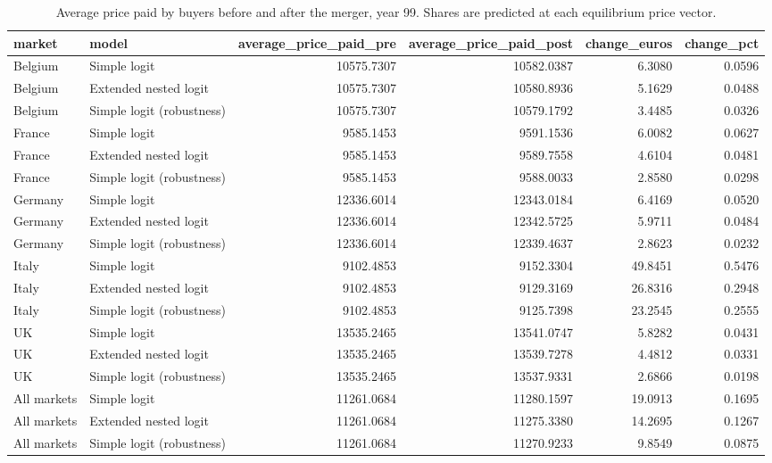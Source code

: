 \begin{table}
\caption{Average price paid by buyers before and after the merger, year 99. Shares are predicted at each equilibrium price vector.}
\label{tab:average_price_paid}
\begin{tabular}{llrrrr}
\toprule
market & model & average\_price\_paid\_pre & average\_price\_paid\_post & change\_euros & change\_pct \\
\midrule
Belgium & Simple logit & 10575.7307 & 10582.0387 & 6.3080 & 0.0596 \\
Belgium & Extended nested logit & 10575.7307 & 10580.8936 & 5.1629 & 0.0488 \\
Belgium & Simple logit (robustness) & 10575.7307 & 10579.1792 & 3.4485 & 0.0326 \\
France & Simple logit & 9585.1453 & 9591.1536 & 6.0082 & 0.0627 \\
France & Extended nested logit & 9585.1453 & 9589.7558 & 4.6104 & 0.0481 \\
France & Simple logit (robustness) & 9585.1453 & 9588.0033 & 2.8580 & 0.0298 \\
Germany & Simple logit & 12336.6014 & 12343.0184 & 6.4169 & 0.0520 \\
Germany & Extended nested logit & 12336.6014 & 12342.5725 & 5.9711 & 0.0484 \\
Germany & Simple logit (robustness) & 12336.6014 & 12339.4637 & 2.8623 & 0.0232 \\
Italy & Simple logit & 9102.4853 & 9152.3304 & 49.8451 & 0.5476 \\
Italy & Extended nested logit & 9102.4853 & 9129.3169 & 26.8316 & 0.2948 \\
Italy & Simple logit (robustness) & 9102.4853 & 9125.7398 & 23.2545 & 0.2555 \\
UK & Simple logit & 13535.2465 & 13541.0747 & 5.8282 & 0.0431 \\
UK & Extended nested logit & 13535.2465 & 13539.7278 & 4.4812 & 0.0331 \\
UK & Simple logit (robustness) & 13535.2465 & 13537.9331 & 2.6866 & 0.0198 \\
All markets & Simple logit & 11261.0684 & 11280.1597 & 19.0913 & 0.1695 \\
All markets & Extended nested logit & 11261.0684 & 11275.3380 & 14.2695 & 0.1267 \\
All markets & Simple logit (robustness) & 11261.0684 & 11270.9233 & 9.8549 & 0.0875 \\
\bottomrule
\end{tabular}
\end{table}
